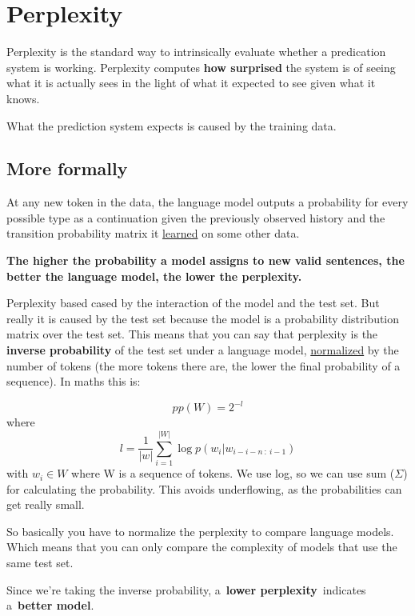 \documentclass[
  11pt,
  british,
]{article}
\begin{document}
\hypertarget{perplexity}{%
\section{Perplexity}\label{perplexity}}

Perplexity is the standard way to intrinsically evaluate whether a
predication system is working. Perplexity computes \textbf{how
surprised} the system is of seeing what it is actually sees in the light
of what it expected to see given what it knows.

What the prediction system expects is caused by the training data.

\hypertarget{more-formally}{%
\subsection{More formally}\label{more-formally}}

At any new token in the data, the language model outputs a probability
for every possible type as a continuation given the previously observed
history and the transition probability matrix it
\href{../Other/Learning.md}{learned} on some other data.

\textbf{The higher the probability a model assigns to new valid
sentences, the better the language model, the lower the perplexity.}

Perplexity based cased by the interaction of the model and the test set.
But really it is caused by the test set because the model is a
probability distribution matrix over the test set. This means that you
can say that perplexity is the \textbf{inverse probability} of the test
set under a language model, \href{../Data/Normalization.md}{normalized}
by the number of tokens (the more tokens there are, the lower the final
probability of a sequence). In maths this is:

\[pp(W) = 2^{-l}\] where
\[l = \frac{1}{|w|}\sum\limits^{|W|}_{i=1}\log p(w_i|w_{i-i-n~:~i-1})\]
with \(w_{i} \in W\) where W is a sequence of tokens. We use log, so we
can use sum (\(\Sigma\)) for calculating the probability. This avoids
underflowing, as the probabilities can get really small.

So basically you have to normalize the perplexity to compare language
models. Which means that you can only compare the complexity of models
that use the same test set.

Since we're taking the inverse probability, a~\textbf{lower
perplexity}~indicates a~\textbf{better model}.
\end{document}
